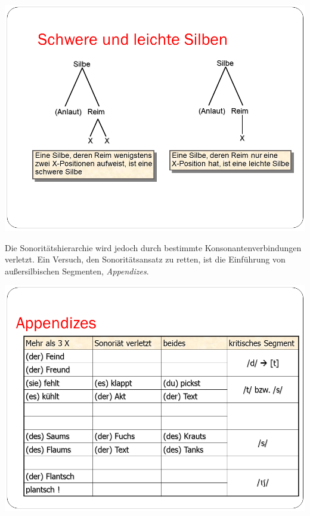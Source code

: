 \documentclass[
  letterpaper,
]{scrbook}
\begin{document}
\includegraphics[width=1\textwidth,height=\textheight]{./pictures/Wagner_Maas_Duden_Petric_22.PNG}

Die Sonoritätshierarchie wird jedoch durch bestimmte
Konsonantenverbindungen verletzt. Ein Versuch, den Sonoritätsansatz zu
retten, ist die Einführung von außersilbischen Segmenten,
\emph{Appendizes}.

\includegraphics[width=1\textwidth,height=\textheight]{./pictures/Wagner_Maas_Duden_Petric_26.PNG}
\end{document}
